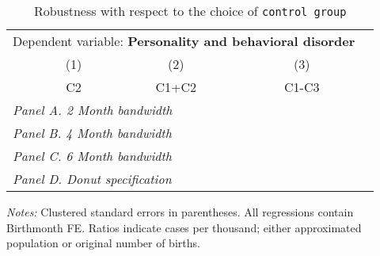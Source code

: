  \begin{table}[H] \begin{threeparttable} \centering \caption{Robustness with respect to the choice of \texttt{control group}} {\def\sym#1{\ifmmode^{#1}\else\(^{#1}\)\fi} \begin{tabular}{l*{4}{c}} \toprule \multicolumn{4}{c}{Dependent variable: \textbf{Personality and behavioral disorder}} \\ \cmidrule(lr){2-4}
            &\multicolumn{1}{c}{(1)}&\multicolumn{1}{c}{(2)}&\multicolumn{1}{c}{(3)}\\
            &\multicolumn{1}{c}{C2}&\multicolumn{1}{c}{C1+C2}&\multicolumn{1}{c}{C1-C3}\\
\midrule
 \multicolumn{4}{l}{\emph{Panel A. 2 Month bandwidth}} \\    \midrule\multicolumn{4}{l}{\emph{Panel B. 4 Month bandwidth}} \\    \midrule\multicolumn{4}{l}{\emph{Panel C. 6 Month bandwidth}} \\    \midrule\multicolumn{4}{l}{\emph{Panel D. Donut specification}} \\    
\bottomrule \end{tabular} } \begin{tablenotes} \item \scriptsize \emph{Notes:} Clustered standard errors in parentheses. All regressions contain Birthmonth FE. Ratios indicate cases per thousand; either approximated population or original number of births. \end{tablenotes} \end{threeparttable} \end{table} 
